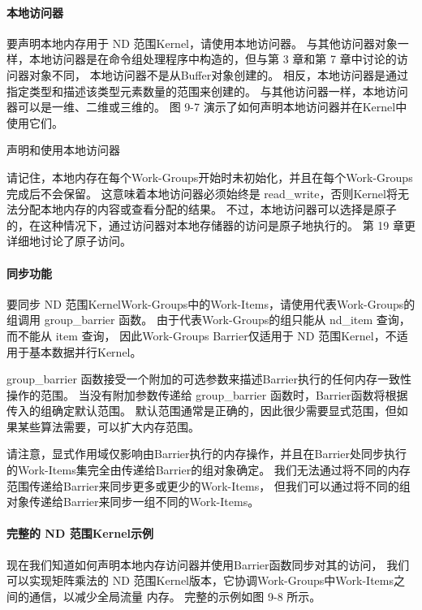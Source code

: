 \paragraph{本地访问器}

要声明本地内存用于 ND 范围Kernel，请使用本地访问器。 
与其他访问器对象一样，本地访问器是在命令组处理程序中构造的，但与第 3 章和第 7 章中讨论的访问器对象不同，
本地访问器不是从Buffer对象创建的。 相反，本地访问器是通过指定类型和描述该类型元素数量的范围来创建的。 
与其他访问器一样，本地访问器可以是一维、二维或三维的。 图 9-7 演示了如何声明本地访问器并在Kernel中使用它们。

{\color{red} 声明和使用本地访问器}

请记住，本地内存在每个Work-Groups开始时未初始化，并且在每个Work-Groups完成后不会保留。 
这意味着本地访问器必须始终是 read\_write，否则Kernel将无法分配本地内存的内容或查看分配的结果。 
不过，本地访问器可以选择是原子的，在这种情况下，通过访问器对本地存储器的访问是原子地执行的。 
第 19 章更详细地讨论了原子访问。

\paragraph{同步功能}

要同步 ND 范围KernelWork-Groups中的Work-Items，请使用代表Work-Groups的组调用 group\_barrier 函数。 
由于代表Work-Groups的组只能从 nd\_item 查询，而不能从 item 查询，
因此Work-Groups Barrier仅适用于 ND 范围Kernel，不适用于基本数据并行Kernel。

group\_barrier 函数接受一个附加的可选参数来描述Barrier执行的任何内存一致性操作的范围。 
当没有附加参数传递给 group\_barrier 函数时，Barrier函数将根据传入的组确定默认范围。 
默认范围通常是正确的，因此很少需要显式范围，但如果某些算法需要，可以扩大内存范围。

请注意，显式作用域仅影响由Barrier执行的内存操作，并且在Barrier处同步执行的Work-Items集完全由传递给Barrier的组对象确定。 
我们无法通过将不同的内存范围传递给Barrier来同步更多或更少的Work-Items，
但我们可以通过将不同的组对象传递给Barrier来同步一组不同的Work-Items。

\paragraph{完整的 ND 范围Kernel示例}

现在我们知道如何声明本地内存访问器并使用Barrier函数同步对其的访问，
我们可以实现矩阵乘法的 ND 范围Kernel版本，它协调Work-Groups中Work-Items之间的通信，以减少全局流量 内存。 
完整的示例如图 9-8 所示。

